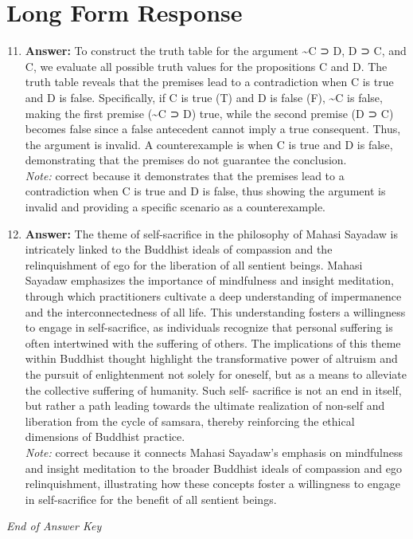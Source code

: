 \documentclass[12pt]{article}
\begin{document}
\section*{Long Form Response}
\begin{enumerate}[label=\arabic*.]
\setcounter{enumi}{10}
\item \textbf{Answer:} To construct the truth table for the argument \textasciitilde{}C ⊃ D, D ⊃ C, and C, we evaluate all possible truth values for the propositions C and D. The truth table reveals that the premises lead to a contradiction when C is true and D is false. Specifically, if C is true (T) and D is false (F), \textasciitilde{}C is false, making the first premise (\textasciitilde{}C ⊃ D) true, while the second premise (D ⊃ C) becomes false since a false antecedent cannot imply a true consequent. Thus, the argument is invalid. A counterexample is when C is true and D is false, demonstrating that the premises do not guarantee the conclusion.
\\ \textit{Note:} correct because it demonstrates that the premises lead to a contradiction when C is true and D is false, thus showing the argument is invalid and providing a specific scenario as a counterexample.
\item \textbf{Answer:} The theme of self-sacrifice in the philosophy of Mahasi Sayadaw is intricately linked to the Buddhist ideals of compassion and the relinquishment of ego for the liberation of all sentient beings. Mahasi Sayadaw emphasizes the importance of mindfulness and insight meditation, through which practitioners cultivate a deep understanding of impermanence and the interconnectedness of all life. This understanding fosters a willingness to engage in self-sacrifice, as individuals recognize that personal suffering is often intertwined with the suffering of others. The implications of this theme within Buddhist thought highlight the transformative power of altruism and the pursuit of enlightenment not solely for oneself, but as a means to alleviate the collective suffering of humanity. Such self- sacrifice is not an end in itself, but rather a path leading towards the ultimate realization of non-self and liberation from the cycle of samsara, thereby reinforcing the ethical dimensions of Buddhist practice.
\\ \textit{Note:} correct because it connects Mahasi Sayadaw's emphasis on mindfulness and insight meditation to the broader Buddhist ideals of compassion and ego relinquishment, illustrating how these concepts foster a willingness to engage in self-sacrifice for the benefit of all sentient beings.
\end{enumerate}

\vfill
\noindent\textit{End of Answer Key}
\end{document}
